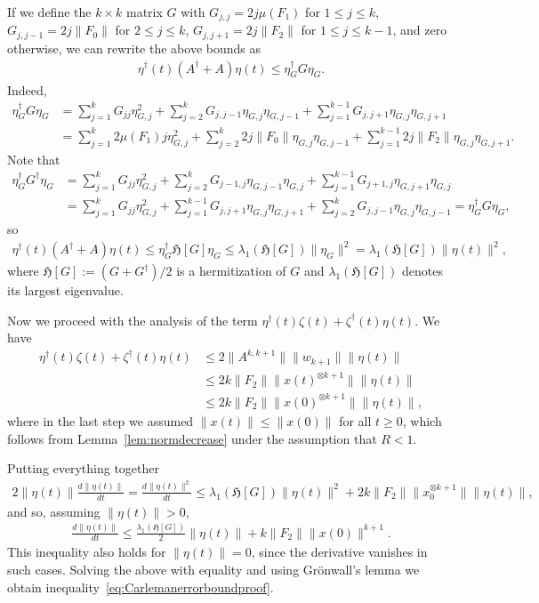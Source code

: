 \documentclass[superscriptaddress,onecolumn,nofootinbib,longbibliography,a4paper,accepted=2026-09-29]{quantumarticle}
\theoremstyle{plain}
\theoremstyle{definition}
\numberwithin{thm}{section}
\numberwithin{assumption}{section}
\numberwithin{lemma}{section}
\numberwithin{prop}{section}
\numberwithin{cor}{section}
\numberwithin{definition}{section}
\numberwithin{rmk}{section}
\numberwithin{equation}{section}
\newcommand{\hh}[1]{\ensuremath{\mathfrak{H}\left[#1\right]}}
\begin{document}
If we define the $k \times k$ matrix $G$ with $G_{j,j} = 2j\mu(F_1) $ for $1 \leq j \leq k$, $G_{j,j-1} = 2j \| F_0\|$ for $2 \leq j \leq k$, $G_{j,j+1} = 2j \|F_2\|$ for $1 \leq j \leq k-1$, and zero otherwise, we can rewrite the above bounds as
\begin{align}
    \eta^\dag(t) (A^\dag + A) \eta(t) \leq \eta_G^\dag G \eta_G. 
\end{align}
Indeed,
\begin{align}
    \eta_G^\dag G \eta_G & = \sum_{j=1}^{k} G_{jj} \eta^2_{G,j} + \sum_{j=2}^{k} G_{j,j-1} \eta_{G,j} \eta_{G,j-1} + \sum_{j=1}^{k-1} G_{j,j+1}  \eta_{G,j} \eta_{G,j+1}\\ & 
    = \sum_{j=1}^{k} 2\mu(F_1) j \eta_{G,j}^2 + \sum_{j=2}^{k} 2 j \| F_0\| \eta_{G,j} \eta_{G,j-1} + \sum_{j=1}^{k-1} 2j \| F_2\| \eta_{G,j} \eta_{G,j+1}. 
\end{align}
Note that
\begin{align}
     \eta_G^\dag G^\dag \eta_G & = \sum_{j=1}^{k} G_{jj} \eta^2_{G,j} + \sum_{j=2}^{k} G_{j-1,j} \eta_{G,j-1} \eta_{G,j} + \sum_{j=1}^{k-1} G_{j+1,j} \eta_{G,j+1} \eta_{G,j} \\
     & = \sum_{j=1}^{k} G_{jj} \eta^2_{G,j} + \sum_{j=1}^{k-1} G_{j,j+1} \eta_{G,j} \eta_{G,j+1} + \sum_{j=2}^{k} G_{j,j-1} \eta_{G,j} \eta_{G,j-1} =  \eta_G^\dag G \eta_G,
\end{align}
so
\begin{align}
    \label{eq:ReGinequality}
    \eta^\dag(t) (A^\dag + A) \eta(t) \leq  \eta_G^\dag \hh{G} \eta_G \leq \lambda_1 (\hh{G}) \| \eta_G\|^2 = \lambda_1 (\hh{G}) \| \eta(t)\|^2,
\end{align}
where $\hh{G}:= (G+G^\dag)/2$ is a hermitization of $G$ and $\lambda_1 (\hh{G})$ denotes its largest eigenvalue. 

Now we proceed with the analysis of the term $\eta^\dag(t)\zeta(t)+ \zeta^\dag(t) \eta(t)$. 
We have
\begin{align}
    \eta^\dag(t)\zeta(t)+ \zeta^\dag(t) \eta(t) & \leq 2 \| A^{k,k+1}\| \| w_{k+1}\| \| \eta(t)\| \\ & \leq 2 k \| F_2\| \|x(t)^{\otimes k+1}\| \| \eta(t)\| \\ & \leq 2 k \| F_2\| \|x(0)^{\otimes k+1}\|  \| \eta(t)\|,
\end{align}
where in the last step we assumed $\|x(t) \| \le \|x(0)\|$ for all $t\ge 0$, which follows from
 Lemma~\ref{lem:normdecrease} under the assumption that $R<1$. 

Putting everything together
\begin{align}
    2 \| \eta(t)\| \frac{d \| \eta(t)\|}{dt} = \frac{d\| \eta(t)\|^2}{dt} \leq  \lambda_1 ( \hh{G}) \| \eta(t)\|^2 +  2 k \| F_2\| \|x_0^{\otimes k+1}\|  \| \eta(t)\|,
\end{align}
and so, assuming $\| \eta(t)\| >0$,
\begin{align}
     \frac{d \| \eta(t)\|}{dt}  \leq \frac{\lambda_1 ( \hh{G})}{2} \| \eta(t)\| +   k \| F_2\| \|x(0)\|^{k+1}.
\end{align}
This inequality also holds for $\|\eta(t)\| = 0$, since the derivative vanishes in such cases.
Solving the above with equality and using Gr\"onwall's lemma we obtain inequality~\eqref{eq:Carlemanerrorboundproof}.
\end{document}
